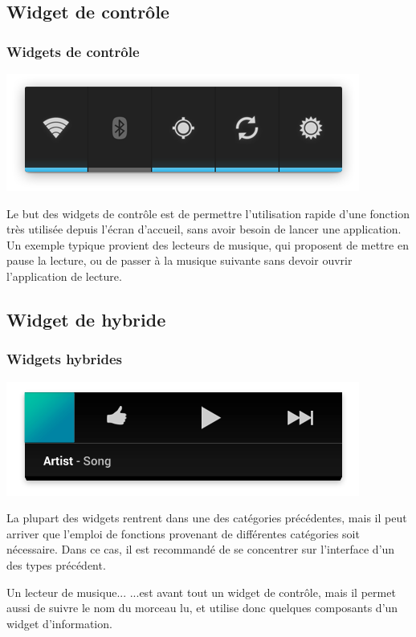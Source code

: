 \documentclass{beamer}
\begin{document}
\subsection{Widget de contrôle}
\begin{frame}
\frametitle{Widgets de contrôle}
\begin{center}
\includegraphics[scale=0.4]{widgets_control.png}
\end{center}

Le but des widgets de contrôle est de permettre l'utilisation rapide d'une fonction très utilisée depuis l'écran d'accueil, sans avoir besoin de lancer une application. Un exemple typique provient des lecteurs de musique, qui proposent de mettre en pause la lecture, ou de passer à la musique suivante sans devoir ouvrir l'application de lecture.
\end{frame}

\subsection{Widget de hybride}
\begin{frame}
\frametitle{Widgets hybrides}
\begin{center}
\includegraphics[scale=0.3]{widgets_hybrid.png}
\end{center}

La plupart des widgets rentrent dans une des catégories précédentes, mais il peut arriver que l'emploi de fonctions provenant de différentes catégories soit nécessaire. Dans ce cas, il est recommandé de se concentrer sur l'interface d'un des types précédent.

\begin{exampleblock}{Un lecteur de musique...}
...est avant tout un widget de contrôle, mais il permet aussi de suivre le nom du morceau lu, et utilise donc quelques composants d'un widget d'information.
\end{exampleblock}
\end{frame}
\end{document}
